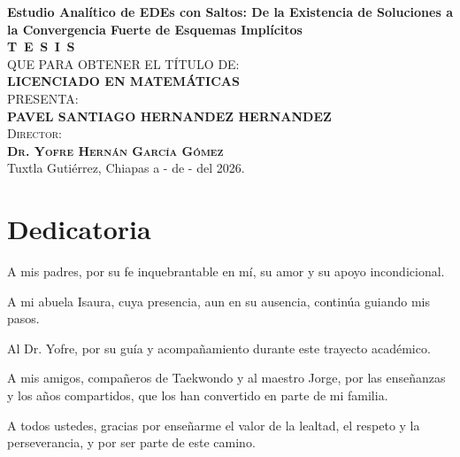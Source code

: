 \begin{titlepage}
\begin{minipage}[t][0.95\textheight][c]{0.76\textwidth}
            \begin{center}
                {\Large\bfseries Estudio Analítico de EDEs con Saltos: De la Existencia de Soluciones a la Convergencia Fuerte de Esquemas Implícitos}\\[2cm]
                \textsc{\huge \textbf{T\, E\, S\, I\, S}}\\[1.5cm]
                \textsc{\large QUE PARA OBTENER EL TÍTULO DE:}\\[0.3cm]
                \textbf{\textsc{LICENCIADO EN MATEMÁTICAS}}\\[1.5cm]
                \textsc{\large PRESENTA:}\\[0.3cm]
                \textbf{\textsc{\large {PAVEL SANTIAGO HERNANDEZ HERNANDEZ}}}\\[2cm]
                {\large\scshape Director:\\[0.3cm]
                {\textbf{\large Dr. Yofre Hernán García Gómez }}}\\[2.0cm]
                \large{Tuxtla Gutiérrez, Chiapas a - de - del 2026.}

            \end{center}
\end{minipage}
\end{titlepage}

\pagebreak[2]

\chapter*{Dedicatoria}
\begin{center}
\itshape
\setlength{\parindent}{0pt} %
\setlength{\parskip}{1.2\baselineskip} %

A mis padres, por su fe inquebrantable en mí, su amor y su apoyo incondicional.

A mi abuela Isaura, cuya presencia, aun en su ausencia, continúa guiando mis pasos.

Al Dr. Yofre, por su guía y acompañamiento durante este trayecto académico.

A mis amigos, compañeros de Taekwondo y al maestro Jorge, por las enseñanzas y los años compartidos, que los han convertido en parte de mi familia.

A todos ustedes, gracias por enseñarme el valor de la lealtad, el respeto y la perseverancia, y por ser parte de este camino.

\end{center}




